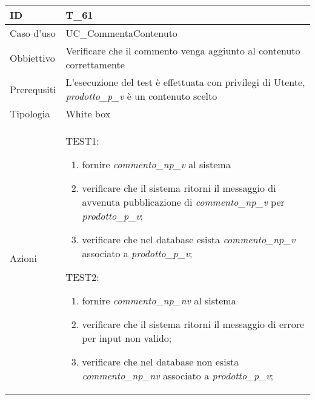 \begin{table}[hb]
    \centering
    \begin{tabular}{ |p{2cm}|p{10cm}|  }
        \hline
        ID          & T\_61                                                                              \\\hline
        Caso d'uso  & UC\_CommentaContenuto                                                              \\\hline
        Obbiettivo  & Verificare che il commento venga aggiunto al contenuto correttamente               \\\hline
        Prerequsiti & L'esecuzione del test è effettuata con privilegi di Utente, \emph{prodotto\_p\_v}
        è un contenuto scelto                                                                            \\\hline
        Tipologia   & White box                                                                          \\\hline
        Azioni      &
        TEST1:
        \begin{enumerate}[nosep, topsep=0pt]
            \item fornire \emph{commento\_np\_v} al sistema
            \item verificare che il sistema ritorni il messaggio di avvenuta pubblicazione
                  di \emph{commento\_np\_v} per \emph{prodotto\_p\_v};
            \item verificare che nel database esista \emph{commento\_np\_v} associato a
                  \emph{prodotto\_p\_v};
        \end{enumerate}
        \vspace{0.5cm} TEST2:
        \begin{enumerate}[nosep, topsep=0pt]
            \item fornire \emph{commento\_np\_nv} al sistema
            \item verificare che il sistema ritorni il messaggio di errore per input non valido;
            \item verificare che nel database non esista \emph{commento\_np\_nv} associato a
                  \emph{prodotto\_p\_v};
        \end{enumerate}
        \\\hline
    \end{tabular}
\end{table}

